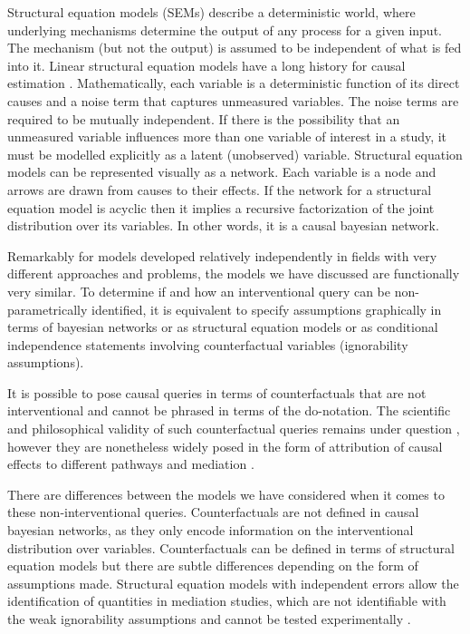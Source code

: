 \documentclass[11pt,a4paper]{article}
\begin{document}
Structural equation models (SEMs) describe a deterministic world, where underlying mechanisms determine the output of any process for a given input. The mechanism (but not the output) is assumed to be independent of what is fed into it. Linear structural equation models have a long history for causal estimation \cite {Wright1921,Haavelmo1943}. Mathematically, each variable is a deterministic function of its direct causes and a noise term that captures unmeasured variables. The noise terms are required to be mutually independent. If there is the possibility that an unmeasured variable influences more than one variable of interest in a study, it must be modelled explicitly as a latent (unobserved) variable. Structural equation models can be represented visually as a network. Each variable is a node and arrows are drawn from causes to their effects. If the network for a structural equation model is acyclic then it implies a recursive factorization of the joint distribution over its variables. In other words, it is a causal bayesian network. 

Remarkably for models developed relatively independently in fields with very different approaches and problems, the models we have discussed are functionally very similar. To determine if and how an interventional query can be non-parametrically identified, it is equivalent to specify assumptions graphically in terms of bayesian networks or as structural equation models or as conditional independence statements involving counterfactual variables (ignorability assumptions). 

It is possible to pose causal queries in terms of counterfactuals that are not interventional and cannot be phrased in terms of the do-notation. The scientific and philosophical validity of such counterfactual queries remains under question \cite{Dawid2000,Dawid2014}, however they are nonetheless widely posed in the form of attribution of causal effects to different pathways and mediation \cite{Pearl2014,Imai2010a,VanderWeele2011}. 

There are differences between the models we have considered when it comes to these non-interventional queries. Counterfactuals are not defined in causal bayesian networks, as they only encode information on the interventional distribution over variables.  Counterfactuals can be defined in terms of structural equation models \cite{Pearl2000} but there are subtle differences depending on the form of assumptions made. Structural equation models with independent errors allow the identification of quantities in mediation studies, which are not identifiable with the weak ignorability assumptions and cannot be tested experimentally \cite{Richardson2013}.  
\end{document}

